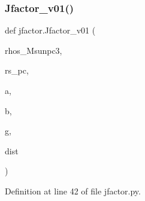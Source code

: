 \subsubsection{\texorpdfstring{Jfactor\+\_\+v01()}{Jfactor\_v01()}}
{\footnotesize\ttfamily def jfactor.\+Jfactor\+\_\+v01 (\begin{DoxyParamCaption}\item[{}]{rhos\+\_\+\+Msunpc3,  }\item[{}]{rs\+\_\+pc,  }\item[{}]{a,  }\item[{}]{b,  }\item[{}]{g,  }\item[{}]{dist }\end{DoxyParamCaption})}



Definition at line 42 of file jfactor.\+py.


